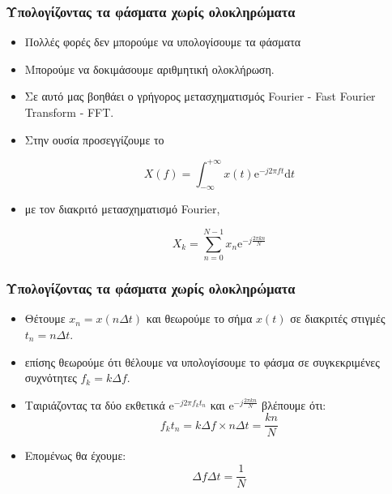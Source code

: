 \documentclass[9pt]{beamer}
\begin{document}
	\begin{frame}
		\frametitle{Υπολογίζοντας τα φάσματα χωρίς ολοκληρώματα}
		\begin{itemize}
			\item Πολλές φορές δεν μπορούμε να υπολογίσουμε τα φάσματα
			\item Μπορούμε να δοκιμάσουμε αριθμητική ολοκλήρωση.
			\item Σε αυτό μας βοηθάει ο γρήγορος μετασχηματισμός Fourier - Fast Fourier Transform - FFT.
			\item Στην ουσία προσεγγίζουμε το 
			
			\begin{equation}
			X(f) = \int_{-\infty}^{+\infty}x(t)\mathrm{e}^{-j2\pi ft}\mathrm{d}t
			\end{equation}	
			
			\item με τον διακριτό μετασχηματισμό Fourier,
			
			\begin{equation}
			X_k = \sum_{n=0}^{N-1}x_n\mathrm{e}^{-j\frac{2\pi kn}{N}}
			\end{equation}
					
			\end{itemize}
		\end{frame}
	
	\begin{frame}
		\frametitle{Υπολογίζοντας τα φάσματα χωρίς ολοκληρώματα}
		\begin{itemize}
			\item Θέτουμε $x_n=x(n\Delta t)$ και θεωρούμε το σήμα $x(t)$ σε διακριτές στιγμές $t_n=n\Delta t$.
			\item επίσης θεωρούμε ότι θέλουμε να υπολογίσουμε το φάσμα σε συγκεκριμένες συχνότητες $f_k=k\Delta f$.
			\item Ταιριάζοντας τα δύο εκθετικά $\mathrm{e}^{-j2\pi f_kt_n}$ και $\mathrm{e}^{-j\frac{2\pi kn}{N}}$ βλέπουμε ότι:
			\begin{equation}
			f_kt_n = k\Delta f \times n\Delta t = \frac{kn}{N}
			\end{equation}
			\item Επομένως θα έχουμε:
			\begin{equation}
			\Delta f \Delta t = \frac{1}{N}
			\end{equation}
		\end{itemize}
	\end{frame}
\end{document}
